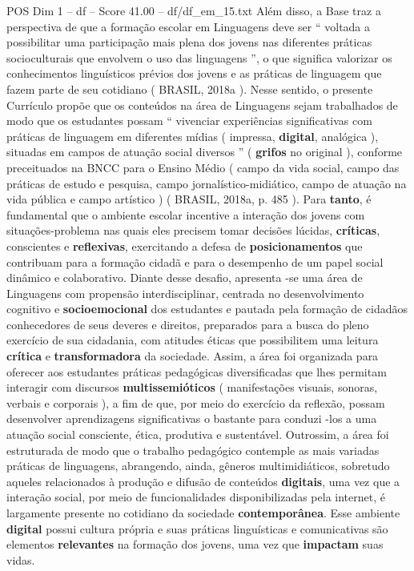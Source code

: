\begin{textsample}{POS Dim 1 – df – Score 41.00 – df/df\_em\_15.txt}
Além disso, a Base traz a perspectiva de que a formação escolar em Linguagens deve ser “ voltada a possibilitar uma participação mais plena dos jovens nas diferentes práticas socioculturais que envolvem o uso das linguagens ”, o que significa valorizar os conhecimentos linguísticos prévios dos jovens e as práticas de linguagem que fazem parte de seu cotidiano ( BRASIL, 2018a ).
Nesse sentido, o presente Currículo propõe que os conteúdos na área de Linguagens sejam trabalhados de modo que os estudantes possam “ vivenciar experiências significativas com práticas de linguagem em diferentes mídias ( impressa, \textbf{digital}, analógica ), situadas em campos de atuação social diversos ” ( \textbf{grifos} no original ), conforme preceituados na BNCC para o Ensino Médio ( campo da vida social, campo das práticas de estudo e pesquisa, campo jornalístico-midiático, campo de atuação na vida pública e campo artístico ) ( BRASIL, 2018a, p. 485 ).
Para \textbf{tanto}, é fundamental que o ambiente escolar incentive a interação dos jovens com situações-problema nas quais eles precisem tomar decisões lúcidas, \textbf{críticas}, conscientes e \textbf{reflexivas}, exercitando a defesa de \textbf{posicionamentos} que contribuam para a formação cidadã e para o desempenho de um papel social dinâmico e colaborativo.
Diante desse desafio, apresenta -se uma área de Linguagens com propensão interdisciplinar, centrada no desenvolvimento cognitivo e \textbf{socioemocional} dos estudantes e pautada pela formação de cidadãos conhecedores de seus deveres e direitos, preparados para a busca do pleno exercício de sua cidadania, com atitudes éticas que possibilitem uma leitura \textbf{crítica} e \textbf{transformadora} da sociedade.
Assim, a área foi organizada para oferecer aos estudantes práticas pedagógicas diversificadas que lhes permitam interagir com discursos \textbf{multissemióticos} ( manifestações visuais, sonoras, verbais e corporais ), a fim de que, por meio do exercício da reflexão, possam desenvolver aprendizagens significativas o bastante para conduzi -los a uma atuação social consciente, ética, produtiva e sustentável.
Outrossim, a área foi estruturada de modo que o trabalho pedagógico contemple as mais variadas práticas de linguagens, abrangendo, ainda, gêneros multimidiáticos, sobretudo aqueles relacionados à produção e difusão de conteúdos \textbf{digitais}, uma vez que a interação social, por meio de funcionalidades disponibilizadas pela internet, é largamente presente no cotidiano da sociedade \textbf{contemporânea}.
Esse ambiente \textbf{digital} possui cultura própria e suas práticas linguísticas e comunicativas são elementos \textbf{relevantes} na formação dos jovens, uma vez que \textbf{impactam} suas vidas.

\end{textsample}
